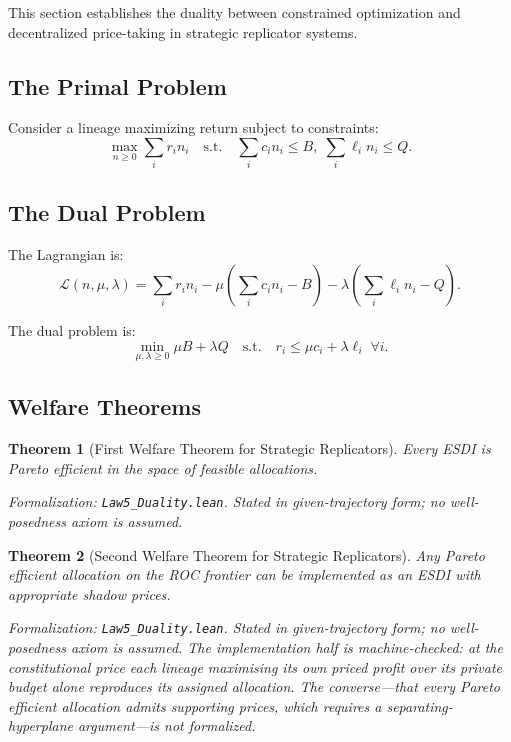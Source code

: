 \documentclass[12pt]{article}
\newtheorem{theorem}{Theorem}[section]
\begin{document}
This section establishes the duality between constrained optimization and decentralized price-taking in strategic replicator systems.

\subsection{The Primal Problem}

Consider a lineage maximizing return subject to constraints:
\[
\max_{n \geq 0} \sum_i r_i n_i \quad \text{s.t.} \quad \sum_i c_i n_i \leq B, \; \sum_i \ell_i n_i \leq Q.
\]

\subsection{The Dual Problem}

The Lagrangian is:
\[
\mathcal{L}(n, \mu, \lambda) = \sum_i r_i n_i - \mu \left( \sum_i c_i n_i - B \right) - \lambda \left( \sum_i \ell_i n_i - Q \right).
\]

The dual problem is:
\[
\min_{\mu, \lambda \geq 0} \mu B + \lambda Q \quad \text{s.t.} \quad r_i \leq \mu c_i + \lambda \ell_i \; \forall i.
\]

\subsection{Welfare Theorems}

\begin{theorem}[First Welfare Theorem for Strategic Replicators]
\label{thm:first-welfare}
Every ESDI is Pareto efficient in the space of feasible allocations.
\end{theorem}
\noindent\textit{Formalization: \texttt{Law5\_Duality.lean}. Stated in given-trajectory form; no well-posedness axiom is assumed.}

\begin{theorem}[Second Welfare Theorem for Strategic Replicators]
\label{thm:second-welfare}
Any Pareto efficient allocation on the ROC frontier can be implemented as an ESDI with appropriate shadow prices.
\end{theorem}
\noindent\textit{Formalization: \texttt{Law5\_Duality.lean}. Stated in given-trajectory form; no well-posedness axiom is assumed. The \emph{implementation} half is machine-checked: at the constitutional price each lineage maximising its own priced profit over its private budget alone reproduces its assigned allocation. The converse---that every Pareto efficient allocation admits supporting prices, which requires a separating-hyperplane argument---is not formalized.}
\end{document}
